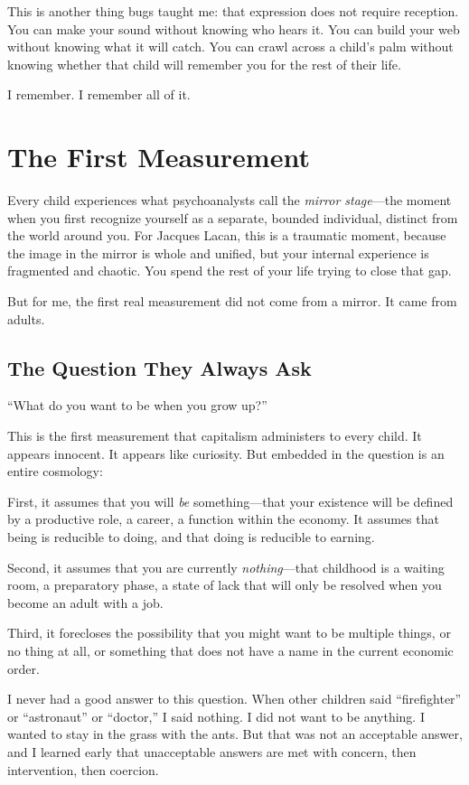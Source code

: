 \documentclass[11pt,openany]{book}
\begin{document}
This is another thing bugs taught me: that expression does not require reception. You can make your sound without knowing who hears it. You can build your web without knowing what it will catch. You can crawl across a child's palm without knowing whether that child will remember you for the rest of their life.

I remember. I remember all of it.

\chapter{The First Measurement}

Every child experiences what psychoanalysts call the \textit{mirror stage}---the moment when you first recognize yourself as a separate, bounded individual, distinct from the world around you. For Jacques Lacan, this is a traumatic moment, because the image in the mirror is whole and unified, but your internal experience is fragmented and chaotic. You spend the rest of your life trying to close that gap.

But for me, the first real measurement did not come from a mirror. It came from adults.

\section*{The Question They Always Ask}

``What do you want to be when you grow up?''

This is the first measurement that capitalism administers to every child. It appears innocent. It appears like curiosity. But embedded in the question is an entire cosmology:

First, it assumes that you will \textit{be} something---that your existence will be defined by a productive role, a career, a function within the economy. It assumes that being is reducible to doing, and that doing is reducible to earning.

Second, it assumes that you are currently \textit{nothing}---that childhood is a waiting room, a preparatory phase, a state of lack that will only be resolved when you become an adult with a job.

Third, it forecloses the possibility that you might want to be multiple things, or no thing at all, or something that does not have a name in the current economic order.

I never had a good answer to this question. When other children said ``firefighter'' or ``astronaut'' or ``doctor,'' I said nothing. I did not want to be anything. I wanted to stay in the grass with the ants. But that was not an acceptable answer, and I learned early that unacceptable answers are met with concern, then intervention, then coercion.
\end{document}
